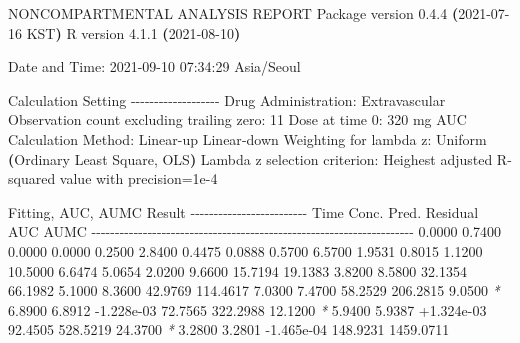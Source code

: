 \documentclass[
  11pt,
  krantz2, a4paper, twoside]{krantz}
\newenvironment{Shaded}{\begin{snugshade}}{\end{snugshade}}
\newcommand{\AttributeTok}[1]{\textcolor[rgb]{0.77,0.63,0.00}{#1}}
\newcommand{\ErrorTok}[1]{\textcolor[rgb]{0.64,0.00,0.00}{\textbf{#1}}}
\newcommand{\ExtensionTok}[1]{#1}
\newcommand{\KeywordTok}[1]{\textcolor[rgb]{0.13,0.29,0.53}{\textbf{#1}}}
\newcommand{\NormalTok}[1]{#1}
\newcommand{\PreprocessorTok}[1]{\textcolor[rgb]{0.56,0.35,0.01}{\textit{#1}}}
\theoremstyle{definition}
\theoremstyle{definition}
\theoremstyle{definition}
\theoremstyle{definition}
\theoremstyle{remark}
\begin{document}
\begin{Shaded}
\begin{Highlighting}[]
                        \ExtensionTok{NONCOMPARTMENTAL}\NormalTok{ ANALYSIS REPORT}
                       \ExtensionTok{Package}\NormalTok{ version 0.4.4 }\ErrorTok{(}\ExtensionTok{2021{-}07{-}16}\NormalTok{ KST}\KeywordTok{)}
                          \ExtensionTok{R}\NormalTok{ version 4.1.1 }\ErrorTok{(}\ExtensionTok{2021{-}08{-}10}\KeywordTok{)}

\ExtensionTok{Date}\NormalTok{ and Time: 2021{-}09{-}10 07:34:29 Asia/Seoul}

\ExtensionTok{Calculation}\NormalTok{ Setting}
\ExtensionTok{{-}{-}{-}{-}{-}{-}{-}{-}{-}{-}{-}{-}{-}{-}{-}{-}{-}{-}{-}}
\ExtensionTok{Drug}\NormalTok{ Administration: Extravascular}
\ExtensionTok{Observation}\NormalTok{ count excluding trailing zero: 11}
\ExtensionTok{Dose}\NormalTok{ at time 0: 320 mg}
\ExtensionTok{AUC}\NormalTok{ Calculation Method: Linear{-}up Linear{-}down}
\ExtensionTok{Weighting}\NormalTok{ for lambda z: Uniform }\ErrorTok{(}\ExtensionTok{Ordinary}\NormalTok{ Least Square, OLS}\KeywordTok{)}
\ExtensionTok{Lambda}\NormalTok{ z selection criterion: Heighest adjusted R{-}squared value with precision=1e{-}4}


\ExtensionTok{Fitting,}\NormalTok{ AUC, AUMC Result}
\ExtensionTok{{-}{-}{-}{-}{-}{-}{-}{-}{-}{-}{-}{-}{-}{-}{-}{-}{-}{-}{-}{-}{-}{-}{-}{-}{-}}
      \ExtensionTok{Time}\NormalTok{         Conc.      Pred.   Residual       AUC       AUMC}
\ExtensionTok{{-}{-}{-}{-}{-}{-}{-}{-}{-}{-}{-}{-}{-}{-}{-}{-}{-}{-}{-}{-}{-}{-}{-}{-}{-}{-}{-}{-}{-}{-}{-}{-}{-}{-}{-}{-}{-}{-}{-}{-}{-}{-}{-}{-}{-}{-}{-}{-}{-}{-}{-}{-}{-}{-}{-}{-}{-}{-}{-}{-}{-}{-}{-}{-}{-}{-}{-}{-}{-}}
     \ExtensionTok{0.0000}\NormalTok{       0.7400                           0.0000     0.0000}
     \ExtensionTok{0.2500}\NormalTok{       2.8400                           0.4475     0.0888}
     \ExtensionTok{0.5700}\NormalTok{       6.5700                           1.9531     0.8015}
     \ExtensionTok{1.1200}\NormalTok{      10.5000                           6.6474     5.0654}
     \ExtensionTok{2.0200}\NormalTok{       9.6600                          15.7194    19.1383}
     \ExtensionTok{3.8200}\NormalTok{       8.5800                          32.1354    66.1982}
     \ExtensionTok{5.1000}\NormalTok{       8.3600                          42.9769   114.4617}
     \ExtensionTok{7.0300}\NormalTok{       7.4700                          58.2529   206.2815}
     \ExtensionTok{9.0500} \PreprocessorTok{*}\NormalTok{     6.8900     6.8912 }\AttributeTok{{-}1.228e{-}03}\NormalTok{    72.7565   322.2988}
    \ExtensionTok{12.1200} \PreprocessorTok{*}\NormalTok{     5.9400     5.9387 +1.324e{-}03    92.4505   528.5219}
    \ExtensionTok{24.3700} \PreprocessorTok{*}\NormalTok{     3.2800     3.2801 }\AttributeTok{{-}1.465e{-}04}\NormalTok{   148.9231  1459.0711}


\end{Highlighting}
\end{Shaded}
\end{document}

